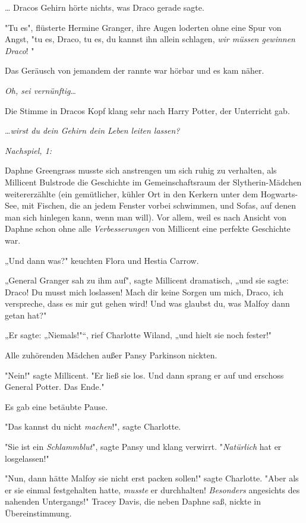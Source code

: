 {… Dracos Gehirn hörte nichts, was Draco gerade sagte.

"Tu es", flüsterte Hermine Granger, ihre Augen loderten ohne eine Spur von Angst, "tu es, Draco, tu es, du kannst ihn allein schlagen, \emph{wir müssen gewinnen Draco}! "

Das Geräusch von jemandem der rannte war hörbar und es kam näher.

\emph{Oh, sei vernünftig}…

Die Stimme in Dracos Kopf klang sehr nach Harry Potter, der Unterricht gab.

…\emph{wirst du dein Gehirn dein Leben leiten lassen?}

\emph{Nachspiel, 1:}

Daphne Greengrass musste sich anstrengen um sich ruhig zu verhalten, als Millicent Bulstrode die Geschichte im Gemeinschaftsraum der Slytherin-Mädchen weitererzählte (ein gemütlicher, kühler Ort in den Kerkern unter dem Hogwarts-See, mit Fischen, die an jedem Fenster vorbei schwimmen, und Sofas, auf denen man sich hinlegen kann, wenn man will). Vor allem, weil es nach Ansicht von Daphne schon ohne alle \emph{Verbesserungen} von Millicent eine perfekte Geschichte war.

„Und dann was?" keuchten Flora und Hestia Carrow.

„General Granger sah zu ihm auf", sagte Millicent dramatisch, „und sie sagte: Draco! Du musst mich loslassen! Mach dir keine Sorgen um mich, Draco, ich verspreche, dass es mir gut gehen wird! Und was glaubst du, was Malfoy dann getan hat?"

„Er sagte: „Niemals!"“, rief Charlotte Wiland, „und hielt sie noch fester!"

Alle zuhörenden Mädchen außer Pansy Parkinson nickten.

"Nein!" sagte Millicent. "Er ließ sie los. Und dann sprang er auf und erschoss General Potter. Das Ende."

Es gab eine betäubte Pause.

"Das kannst du nicht \emph{machen}!", sagte Charlotte.

"Sie ist ein \emph{Schlammblut}", sagte Pansy und klang verwirrt. "\emph{Natürlich} hat er losgelassen!"

"Nun, dann hätte Malfoy sie nicht erst packen sollen!" sagte Charlotte. "Aber als er sie einmal festgehalten hatte, \emph{musste} er durchhalten! \emph{Besonders} angesichts des nahenden Untergangs!" Tracey Davis, die neben Daphne saß, nickte in Übereinstimmung.

}
